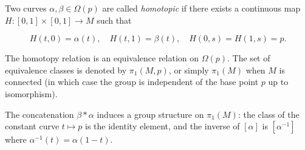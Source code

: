 Two curves $\alpha, \beta \in \Omega(p)$ are called \emph{homotopic} if there exists a continuous map $H: [0,1] \times [0,1] \to M$ such that

$$H(t,0) = \alpha(t), \quad H(t,1) = \beta(t), \quad H(0,s) = H(1,s) = p.$$

The homotopy relation is an equivalence relation on $\Omega(p)$. The set of equivalence classes is denoted by $\pi_1(M, p)$, or simply $\pi_1(M)$ when $M$ is connected (in which case the group is independent of the base point $p$ up to isomorphism).

The concatenation $\beta * \alpha$ induces a group structure on $\pi_1(M)$: the class of the constant curve $t \mapsto p$ is the identity element, and the inverse of $[\alpha]$ is $[\alpha^{-1}]$ where $\alpha^{-1}(t) = \alpha(1-t)$.
